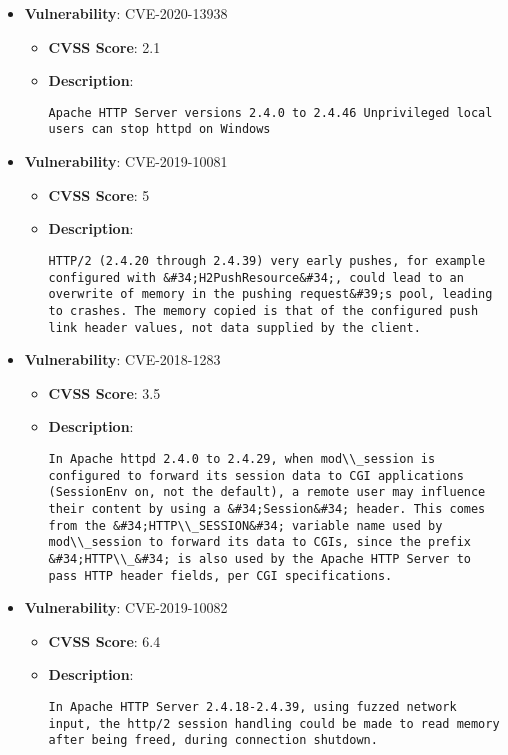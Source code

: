 \documentclass{article}
\begin{document}
\begin{itemize}
        \item \textbf{Vulnerability}: CVE-2020-13938
        \begin{itemize}
            \item \textbf{CVSS Score}:  2.1 
            \item \textbf{Description}:
            \parbox[t]{0.9\linewidth}{
                \verb|Apache HTTP Server versions 2.4.0 to 2.4.46 Unprivileged local users can stop httpd on Windows|
            }
        \end{itemize}
    
        \item \textbf{Vulnerability}: CVE-2019-10081
        \begin{itemize}
            \item \textbf{CVSS Score}:  5 
            \item \textbf{Description}:
            \parbox[t]{0.9\linewidth}{
                \verb|HTTP/2 (2.4.20 through 2.4.39) very early pushes, for example configured with &#34;H2PushResource&#34;, could lead to an overwrite of memory in the pushing request&#39;s pool, leading to crashes. The memory copied is that of the configured push link header values, not data supplied by the client.|
            }
        \end{itemize}
    
        \item \textbf{Vulnerability}: CVE-2018-1283
        \begin{itemize}
            \item \textbf{CVSS Score}:  3.5 
            \item \textbf{Description}:
            \parbox[t]{0.9\linewidth}{
                \verb|In Apache httpd 2.4.0 to 2.4.29, when mod\\_session is configured to forward its session data to CGI applications (SessionEnv on, not the default), a remote user may influence their content by using a &#34;Session&#34; header. This comes from the &#34;HTTP\\_SESSION&#34; variable name used by mod\\_session to forward its data to CGIs, since the prefix &#34;HTTP\\_&#34; is also used by the Apache HTTP Server to pass HTTP header fields, per CGI specifications.|
            }
        \end{itemize}
    
        \item \textbf{Vulnerability}: CVE-2019-10082
        \begin{itemize}
            \item \textbf{CVSS Score}:  6.4 
            \item \textbf{Description}:
            \parbox[t]{0.9\linewidth}{
                \verb|In Apache HTTP Server 2.4.18-2.4.39, using fuzzed network input, the http/2 session handling could be made to read memory after being freed, during connection shutdown.|
            }
        \end{itemize}
    

\end{itemize}
\end{document}

